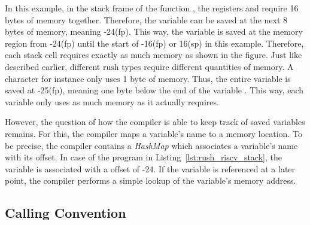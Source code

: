 In this example, in the stack frame of the function , the registers  and  require 16 bytes of memory together.
Therefore, the variable  can be saved at the next 8 bytes of memory, meaning -24(fp).
This way, the variable is saved at the memory region from -24(fp) until the start of -16(fp) or 16(sp) in this example.
Therefore, each stack cell requires exactly as much memory as shown in the figure.
Just like described earlier, different rush types require different quantities of memory.
A character for instance only uses 1 byte of memory.
Thus, the entire variable  is saved at -25(fp), meaning one byte below the end of the variable .
This way, each variable only uses as much memory as it actually requires.

However, the question of how the compiler is able to keep track of saved variables remains.
For this, the compiler maps a variable's name to a memory location.
To be precise, the compiler contains a \emph{HashMap} which associates a variable's name with its  offset.
In case of the program in Listing~\ref{lst:rush_riscv_stack}, the variable  is associated with a  offset of -24.
If the variable is referenced at a later point, the compiler performs a simple lookup of the variable's memory address.

\subsection{Calling Convention}\label{sec:riscv_calling_conv}


